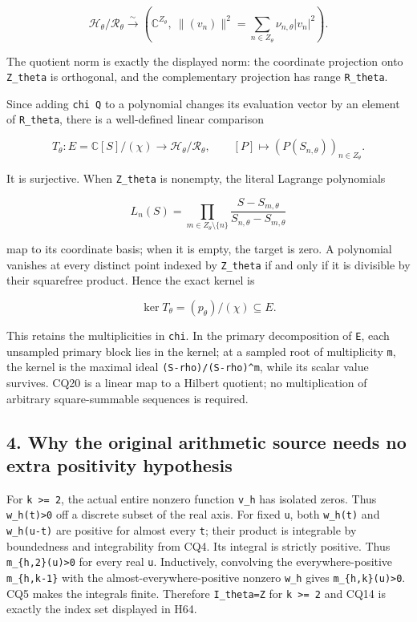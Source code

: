 \[
\mathcal H_\theta/\mathcal R_\theta
\xrightarrow{\sim}
\left(\mathbb C^{Z_\theta},
\ \|(v_n)\|^2=\sum_{n\in Z_\theta}\nu_{n,\theta}|v_n|^2\right).
\tag{CQ19}
\]

The quotient norm is exactly the displayed norm: the coordinate projection onto \texttt{Z\_theta} is orthogonal, and the complementary projection has range \texttt{R\_theta}.

Since adding \texttt{chi\ Q} to a polynomial changes its evaluation vector by an element of \texttt{R\_theta}, there is a well-defined linear comparison

\[
T_\theta:E=\mathbb C[S]/(\chi)
\longrightarrow\mathcal H_\theta/\mathcal R_\theta,
\qquad
[P]\longmapsto(P(S_{n,\theta}))_{n\in Z_\theta}.
\tag{CQ20}
\]

It is surjective. When \texttt{Z\_theta} is nonempty, the literal Lagrange polynomials

\[
L_n(S)=\prod_{m\in Z_\theta\setminus\{n\}}
\frac{S-S_{m,\theta}}{S_{n,\theta}-S_{m,\theta}}
\tag{CQ21}
\]

map to its coordinate basis; when it is empty, the target is zero. A polynomial vanishes at every distinct point indexed by \texttt{Z\_theta} if and only if it is divisible by their squarefree product. Hence the exact kernel is

\[
\ker T_\theta=(p_\theta)/(\chi)\subseteq E.
\tag{CQ22}
\]

This retains the multiplicities in \texttt{chi}. In the primary decomposition of \texttt{E}, each unsampled primary block lies in the kernel; at a sampled root of multiplicity \texttt{m}, the kernel is the maximal ideal \texttt{(S-rho)/(S-rho)\^{}m}, while its scalar value survives. CQ20 is a linear map to a Hilbert quotient; no multiplication of arbitrary square-summable sequences is required.

\subsection{4. Why the original arithmetic source needs no extra positivity hypothesis}\label{why-the-original-arithmetic-source-needs-no-extra-positivity-hypothesis}

For \texttt{k\ \textgreater{}=\ 2}, the actual entire nonzero function \texttt{v\_h} has isolated zeros. Thus \texttt{w\_h(t)\textgreater{}0} off a discrete subset of the real axis. For fixed \texttt{u}, both \texttt{w\_h(t)} and \texttt{w\_h(u-t)} are positive for almost every \texttt{t}; their product is integrable by boundedness and integrability from CQ4. Its integral is strictly positive. Thus \texttt{m\_\{h,2\}(u)\textgreater{}0} for every real \texttt{u}. Inductively, convolving the everywhere-positive \texttt{m\_\{h,k-1\}} with the almost-everywhere-positive nonzero \texttt{w\_h} gives \texttt{m\_\{h,k\}(u)\textgreater{}0}. CQ5 makes the integrals finite. Therefore \texttt{I\_theta=Z} for \texttt{k\ \textgreater{}=\ 2} and CQ14 is exactly the index set displayed in H64.

